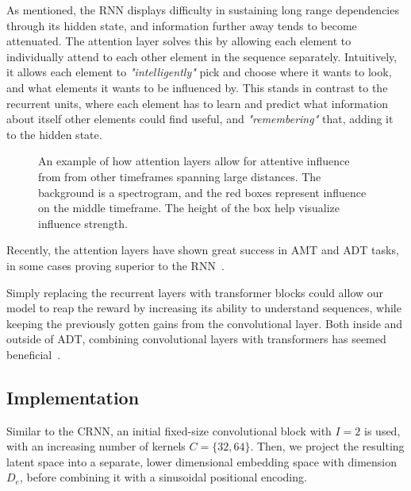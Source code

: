 As mentioned, the \gls{RNN} displays difficulty in sustaining long range dependencies through its hidden state, and information further away tends to become attenuated. The attention layer solves this by allowing each element to individually attend to each other element in the sequence separately. Intuitively, it allows each element to \textit{"intelligently"} pick and choose where it wants to look, and what elements it wants to be influenced by. This stands in contrast to the recurrent units, where each element has to learn and predict what information about itself other elements could find useful, and \textit{"remembering"} that, adding it to the hidden state.

\begin{figure}[H]
    \centering
    
    \caption{An example of how attention layers allow for attentive influence from from other timeframes spanning large distances. The background is a spectrogram, and the red boxes represent influence on the middle timeframe. The height of the box help visualize influence strength.}
    \label{CTInfluenceFigure}
\end{figure}


Recently, the attention layers have shown great success in \gls{AMT} and \gls{ADT} tasks, in some cases proving superior to the \gls{RNN}~\cite{gardner2022mt3multitaskmultitrackmusic, chang2024yourmt3+, zehren2024analyzingreducingsynthetictorealtransfer}.

Simply replacing the recurrent layers with transformer blocks could allow our model to reap the reward by increasing its ability to understand sequences, while keeping the previously gotten gains from the convolutional layer. Both inside and outside of \gls{ADT}, combining convolutional layers with transformers has seemed beneficial~\cite{zehren2024analyzingreducingsynthetictorealtransfer, gulati2020conformerconvolutionaugmentedtransformerspeech}.

\subsection{Implementation}

Similar to the \gls{CRNN}, an initial fixed-size convolutional block with $I = 2$ is used, with an increasing number of kernels $C = \{32, 64\}$. Then, we project the resulting latent space into a separate, lower dimensional embedding space with dimension $D_e$, before combining it with a sinusoidal positional encoding. 


